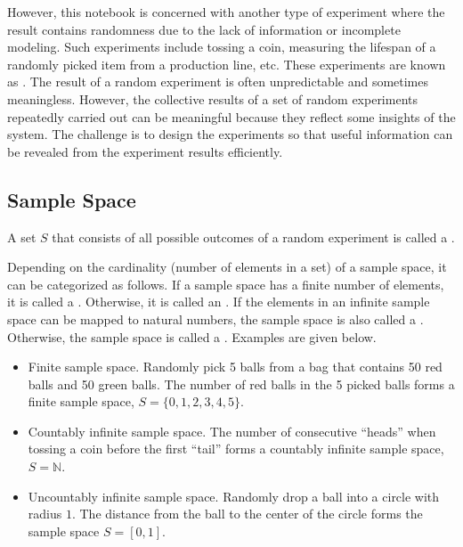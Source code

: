 However, this notebook is concerned with another type of experiment where the result contains randomness due to the lack of information or incomplete modeling. Such experiments include tossing a coin, measuring the lifespan of a randomly picked item from a production line, etc. These experiments are known as . The result of a random experiment is often unpredictable and sometimes meaningless. However, the collective results of a set of random experiments repeatedly carried out can be meaningful because they reflect some insights of the system. The challenge is to design the experiments so that useful information can be revealed from the experiment results efficiently.

\subsection{Sample Space}

A set $S$ that consists of all possible outcomes of a random experiment is called a .

Depending on the cardinality (number of elements in a set) of a sample space, it can be categorized as follows. If a sample space has a finite number of elements, it is called a . Otherwise, it is called an . If the elements in an infinite sample space can be mapped to natural numbers, the sample space is also called a . Otherwise, the sample space is called a . Examples are given below.
\begin{itemize}
	\item Finite sample space. Randomly pick 5 balls from a bag that contains 50 red balls and 50 green balls. The number of red balls in the 5 picked balls forms a finite sample space, $S = \{0, 1, 2, 3, 4, 5\}$.
	\item Countably infinite sample space. The number of consecutive ``heads'' when tossing a coin before the first ``tail'' forms a countably infinite sample space, $S = \mathbb{N}$.
	\item Uncountably infinite sample space. Randomly drop a ball into a circle with radius $1$. The distance from the ball to the center of the circle forms the sample space $S=[0,1]$.
\end{itemize}

